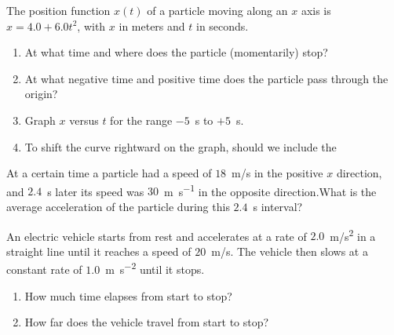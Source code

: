 \begin{problem}
	The position function $x(t)$ of a particle moving along an $x$ axis
	is $x   = 4.0 + 6.0t^2$, with $x$ in meters and $t$ in seconds.
	\begin{enumerate}[label = (\alph*)]
		\item At what time and where does the particle (momentarily) stop?
		\item At what negative time and positive time does the particle pass
		through the origin?
		\item Graph $x$ versus $t$ for the range $-5$~s to $+5$~s.
		\item To shift the curve rightward on the graph, should we include the
	\end{enumerate}
\end{problem}


\begin{problem}
	At a certain time a particle had a speed of $18$~m/s in the positive $x$ direction, and $2.4$~s later its speed was $30$~\si{\meter\per\second} in the
	opposite direction.What is the average acceleration of the particle during this $2.4 $~\si{\second} interval?
\end{problem}


\begin{problem}
	An electric vehicle starts from rest and accelerates at a rate
	of $2.0$~m/s\textsuperscript{2} in a straight line until it reaches a speed of $20$~m/s. The
	vehicle then slows at a constant rate of $1.0$~\si{\meter\per\square\second} until it stops.
	\begin{enumerate}[label = (\alph*)]
		\item How much time elapses from start to stop?
		\item How far does the vehicle travel from start to stop?
	\end{enumerate}
\end{problem}


